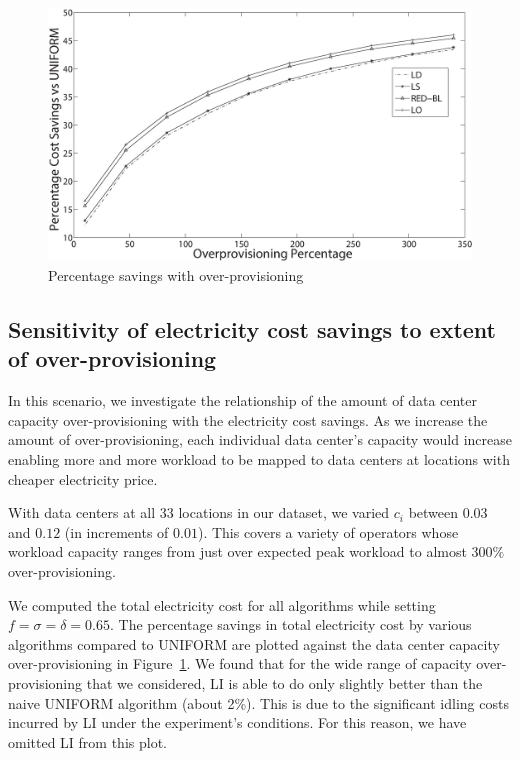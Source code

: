 \begin{figure}
\centering
\includegraphics[width=\textwidth]{pics/s1vseqr.eps}
    \caption{Percentage savings with over-provisioning}
    \label{fig:s1r}
\end{figure}

\subsection{Sensitivity of electricity cost savings to extent of over-provisioning}In this scenario, we investigate the relationship of the amount of data center capacity over-provisioning with the electricity cost savings. As we increase the amount of over-provisioning, each individual data center's capacity would increase enabling more and more workload to be mapped to data centers at locations with cheaper electricity price.

With data centers at all
    $33$ locations in our dataset, we varied $c_i$ between $0.03$ and
    $0.12$ (in increments of $0.01$). This covers a variety of operators whose workload capacity ranges from just over expected peak workload to
almost $300\%$ over-provisioning.

We computed the total electricity cost for all algorithms while setting $f=\sigma=\delta=0.65$. The percentage savings in total electricity cost by various algorithms compared to UNIFORM are plotted against the data center capacity over-provisioning in Figure~\ref{fig:s1r}. We found that for the wide range of capacity over-provisioning that we considered, LI is able to do only slightly better than the naive UNIFORM algorithm (about 2\%). This is due to the significant idling costs incurred by LI under the experiment's conditions. For this reason, we have omitted LI from this plot.

